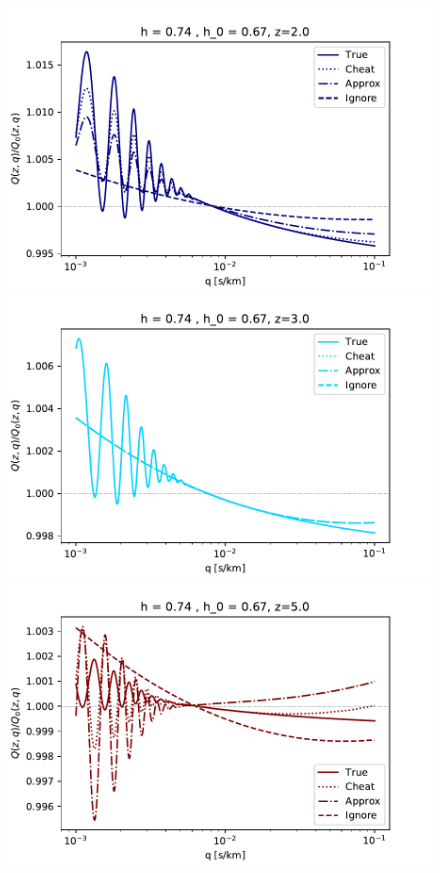 \begin{figure}[ht]
 \begin{center}
  \includegraphics[scale=0.7]{Figures/recP_h074_0}
  \includegraphics[scale=0.7]{Figures/recP_h074_1}
  \includegraphics[scale=0.7]{Figures/recP_h074_2}

\end{center}
\end{figure}
